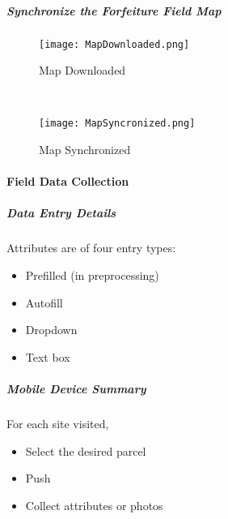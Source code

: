 

 \clearpage


 \subparagraph{Synchronize the Forfeiture Field Map}

 \begin{wrapfigure}{r}{0.5\textwidth}
 \centering
     \texttt{[image: MapDownloaded.png]}
 \caption{Map Downloaded}
 \vspace{.25in}

 \HRule \\[.4cm] %
 \vspace{.25in}

     \texttt{[image: MapSyncronized.png]}
 \caption{Map Synchronized}
 \end{wrapfigure}
 \vspace{1in}

 \vspace{3in}

 \vspace{1in}

 \clearpage

 \paragraph{Field Data Collection}
 \subparagraph{Data Entry Details}

 Attributes are of four entry types:
 \begin{itemize}
 \item Prefilled {\scriptsize (in preprocessing)}
 \item Autofill
 \item Dropdown
 \item Text box
 \end{itemize}
 \vspace{1in}

 \subparagraph{Mobile Device Summary}

 For each site visited,

 \begin{itemize}
 \item Select the desired parcel
 \item Push 
 \item Collect attributes or photos
 \end{itemize}

